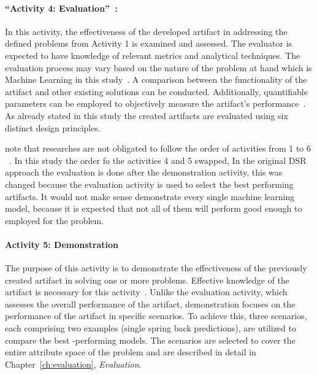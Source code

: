 \paragraph{``Activity 4: Evaluation''~\cite[p. 56]{peffers_designscienceresearch_2007}:}
In this activity, the effectiveness of the developed artifact in addressing the defined problems from Activity 1 is
examined and assessed.
The evaluator is expected to have knowledge of relevant metrics and analytical techniques.
The evaluation process may vary based on the nature of the problem at hand which is Machine Learning in this
study~\cite[p. 56]{peffers_designscienceresearch_2007}.
A comparison between the functionality of the artifact and other existing solutions can be conducted.
Additionally, quantifiable parameters can be employed to objectively measure the artifact's
performance~\cite[p. 56]{peffers_designscienceresearch_2007}.
As already stated in this study the created artifacts are evaluated using six distinct design principles.


\cite{peffers_designscienceresearch_2007} note that researches are not obligated to follow the order of activities
from 1 to 6
~\cite[p. 56]{peffers_designscienceresearch_2007}.
In this study the order fo the activities 4 and 5 swapped,
In the original DSR approach the evaluation is done after the demonstration activity, this was changed because the
evaluation activity is used to select the best performing artifacts.
It would not make sense demonstrate every single machine learning model, because it is expected that not all of them
will perform good enough to employed for the problem.

\paragraph{Activity 5: Demonstration}
The purpose of this activity is to demonstrate the effectiveness of the previously created artifact in solving one or
more problems.
Effective knowledge of the artifact is necessary for this
activity~\cite[p. 55]{peffers_designscienceresearch_2007}.
Unlike the evaluation activity, which assesses the overall performance of the artifact, demonstration focuses on the
performance of the artifact in specific scenarios.
To achieve this, three scenarios, each comprising two examples (single spring back predictions), are utilized to
compare the best -performing models.
The scenarios are selected to cover the entire attribute space of the problem and are described in detail in
Chapter~\ref{ch:evaluation}, \textit{Evaluation}.

